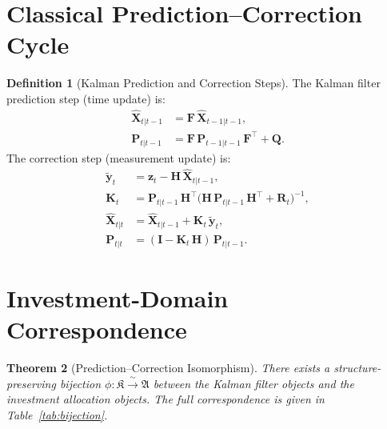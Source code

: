 \documentclass[12pt,openany]{book}
\numberwithin{equation}{chapter}
\theoremstyle{plain}
\newtheorem{theorem}{Theorem}[chapter]
\theoremstyle{definition}
\newtheorem{definition}[theorem]{Definition}
\theoremstyle{remark}
\begin{document}
\section{Classical Prediction--Correction Cycle}

\begin{definition}[Kalman Prediction and Correction Steps]
\label{def:kalman}
The Kalman filter prediction step (time update) is:
\begin{align}
  \hat{\mathbf{X}}_{t|t-1}
    &= \mathbf{F}\,\hat{\mathbf{X}}_{t-1|t-1},
  \label{eq:kf-predict-state} \\
  \mathbf{P}_{t|t-1}
    &= \mathbf{F}\,\mathbf{P}_{t-1|t-1}\,\mathbf{F}^\top
       + \mathbf{Q}.
  \label{eq:kf-predict-cov}
\end{align}
The correction step (measurement update) is:
\begin{align}
  \tilde{\mathbf{y}}_t
    &= \mathbf{z}_t - \mathbf{H}\,\hat{\mathbf{X}}_{t|t-1},
  \label{eq:kf-innovation} \\
  \mathbf{K}_t
    &= \mathbf{P}_{t|t-1}\,\mathbf{H}^\top
       \!\bigl(\mathbf{H}\,\mathbf{P}_{t|t-1}\,\mathbf{H}^\top
       + \mathbf{R}_t\bigr)^{-1},
  \label{eq:kf-gain} \\
  \hat{\mathbf{X}}_{t|t}
    &= \hat{\mathbf{X}}_{t|t-1}
       + \mathbf{K}_t\,\tilde{\mathbf{y}}_t,
  \label{eq:kf-update-state} \\
  \mathbf{P}_{t|t}
    &= (\mathbf{I} - \mathbf{K}_t\,\mathbf{H})\,
       \mathbf{P}_{t|t-1}.
  \label{eq:kf-update-cov}
\end{align}
\end{definition}

\section{Investment-Domain Correspondence}

\begin{theorem}[Prediction--Correction Isomorphism]
\label{thm:isomorphism}
There exists a structure-preserving bijection
$\phi : \mathfrak{K} \xrightarrow{\;\sim\;} \mathfrak{A}$
between the Kalman filter objects and the investment allocation
objects.  The full correspondence is given in
Table~\ref{tab:bijection}.
\end{theorem}
\end{document}

